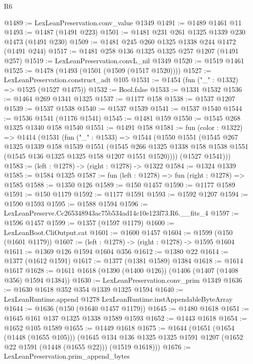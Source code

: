\begin{lexlean}{R6}
\begin{coremodule}
@1489 := LexLeanPreservation.conv_value @1349
@1491 := @1489 @1461 @11
@1493 := @1487 (@1491 @223)
@1501 := @1481 @231 @261 @1325 @1339 @230 @1473 (@1491 @230)
@1509 := @1481 @245 @260 @1325 @1338 @244 @1472 (@1491 @244)
@1517 := @1481 @258 @136 @1325 @1325 @257 @1207 (@1491 @257)
@1519 := LexLeanPreservation.convL_nil @1349
@1520 := @1519 @1461
@1525 := @1478 (@1493 (@1501 (@1509 (@1517 @1520))))
@1527 := LexLeanPreservation.construct_adt @105
@1531 := @1454 (fun ("_" : @1332) => @1525 (@1527 @1475))
@1532 := Bool.false
@1533 := @1331 @1532
@1536 := @1464 @269 @1341 @1325
@1537 := @1177 @158
@1538 := @1537 @1207
@1539 := @1537 @1538
@1540 := @1537 @1539
@1541 := @1537 @1540
@1544 := @1536 @1541 (@1176 @1541)
@1545 := @1481 @159
@1550 := @1545 @268 @1325 @1340 @158 @1540
@1551 := @1491 @158
@1581 := fun (color : @1322) =>
  @1414
    (@1531
      (fun ("_" : @1533) =>
      @1544
        (@1550
          @1551
          (@1545
            @267
            @1325
            @1339
            @158
            @1539
            @1551
            (@1545
              @266
              @1325
              @1338
              @158
              @1538
              @1551
              (@1545 @136 @1325 @1325 @158 @1207 @1551 @1520))))
        (@1527 @1541)))
@1583 := (left : @1278) -> (right : @1278) -> @1322
@1584 := @1324 @1339
@1585 := @1584 @1325
@1587 := fun (left : @1278) => fun (right : @1278) => @1585
@1588 := @1350 @126
@1589 := @150 @1457
@1590 := @1177 @1589
@1591 := @150 @1179
@1592 := @1177 @1591
@1593 := @1592 @1207
@1594 := @1590 @1593
@1595 := @1588 @1594
@1596 := LexLeanPreserve.Cc265348943ac75b534ad14c10e123f73.R6.__fits_4
@1597 := @1596 @1457
@1599 := @1357 (@1597 @1179)
@1600 := LexLeanBoot.CliOutput.cat
@1601 := @1600 @1457
@1604 := @1599 (@150 (@1601 @1179))
@1607 := (left : @1278) -> (right : @1278) -> @1595 @1604
@1611 := @1369 @126 @1594 @1604 @356
@1612 := @1380 @22
@1614 := @1377 (@1612 @1591)
@1617 := @1377 (@1381 @1589) @1384
@1618 := @1614 @1617
@1628 := @1611 @1618 (@1390 (@1400 @126)) (@1406 (@1407 (@1408 @356) @1594 @1384))
@1630 := LexLeanPreservation.conv_prim @1349
@1636 := @1630 @1618 @352 @354 @1339 @1325 @1594
@1640 := LexLeanRuntime.append @1278 LexLeanRuntime.instAppendableByteArray
@1644 := @1636 (@150 (@1640 @1457 @1179))
@1645 := @1480 @1618
@1651 := @1645 @161 @137 @1325 @1338 @1589 @1593
@1652 := @1443 @1618
@1654 := @1652 @105 @1589
@1655 := @1449 @1618
@1675 := @1644
    (@1651
      (@1654 (@1448 (@1655 @105)))
      (@1645 @134 @136 @1325 @1325 @1591 @1207 (@1652 @22 @1591 (@1448 (@1655 @22))) (@1519 @1618)))
@1676 := LexLeanPreservation.prim_append_bytes

\end{coremodule}
\end{lexlean}
